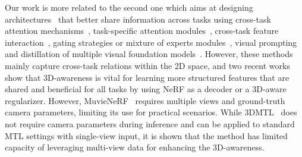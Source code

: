 
Our work is more related to the second one which aims at designing architectures~\cite{kokkinos2017ubernet,ruder2019latent,vandenhende2019branched,liang2018evolutionary,bragman2019stochastic,strezoski2019many,xu2018pad,zhang2019pattern,bruggemann2021exploring,bilen2016integrated,zhang2018joint} that better share information across tasks 
using cross-task attention mechanisms~\cite{misra2016cross}, task-specific attention modules~\cite{liu2019end,bhattacharjee2023vision}, cross-task feature interaction~\cite{ye2022inverted,vandenhende2020mti}, gating strategies or {mixture of experts modules~\cite{bruggemann2020automated,guo2020learning,chen2023mod,fan2022m3vit,ye2023taskexpert}, visual prompting~\cite{ye2022taskprompter,liu2023hierarchical}} and distillation of multiple visual foundation models~\cite{ranzinger2024radio,heinrich2025radiov2,lu2024swiss}. However, these methods mainly capture cross-task relations within the 2D space, and two recent works~\cite {li2023multi,zheng2023multi} show that 3D-awareness is vital for learning more structured features that are shared and beneficial for all tasks by using NeRF as a decoder or a 3D-aware regularizer. However, MuvieNeRF~\cite{zheng2023multi} requires multiple views and ground-truth camera parameters, limiting its use for practical scenarios. While 3DMTL~\cite{li2023multi} does not require camera parameters during inference and can be applied to standard MTL settings with single-view input, it is shown that the method has limited capacity of leveraging multi-view data for enhancing the 3D-awareness. 












